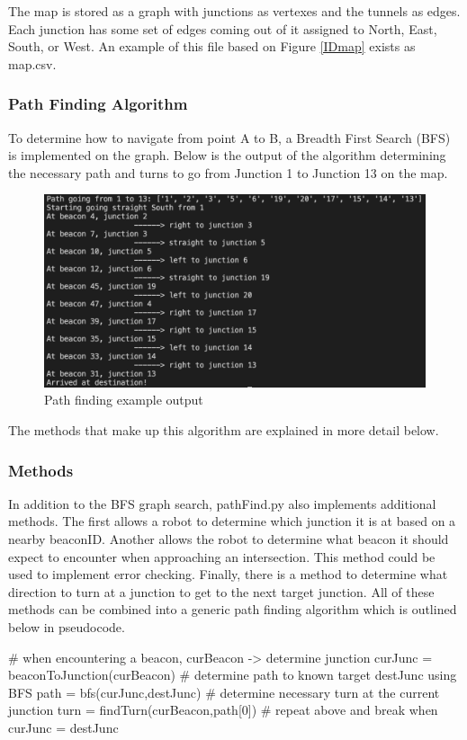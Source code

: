 \documentclass[12pt]{report}
\begin{document}
The map is stored as a graph with junctions as vertexes and the tunnels as edges. Each junction has some set of edges coming out of it assigned to North, East, South, or West. An example of this file based on Figure \ref{IDmap} exists as map.csv.

\subsubsection{Path Finding Algorithm}
To determine how to navigate from point A to B, a Breadth First Search (BFS) is implemented on the graph. Below is the output of the algorithm determining the necessary path and turns to go from Junction 1 to Junction 13 on the map.

\begin{figure}[H]
    \centering
    \includegraphics[scale=0.33]{images/pathfinding.png}
    \caption{Path finding example output}
\end{figure}

The methods that make up this algorithm are explained in more detail below.

\subsubsection{Methods}
In addition to the BFS graph search, pathFind.py also implements additional methods. The first allows a robot to determine which junction it is at based on a nearby beaconID. Another allows the robot to determine what beacon it should expect to encounter when approaching an intersection. This method could be used to implement error checking. Finally, there is a method to determine what direction to turn at a junction to get to the next target junction. All of these methods can be combined into a generic path finding algorithm which is outlined below in pseudocode.

\begin{python}
# when encountering a beacon, curBeacon -> determine junction
curJunc = beaconToJunction(curBeacon)
# determine path to known target destJunc using BFS
path = bfs(curJunc,destJunc)
# determine necessary turn at the current junction
turn = findTurn(curBeacon,path[0])
# repeat above and break when curJunc = destJunc
\end{python}
\end{document}
